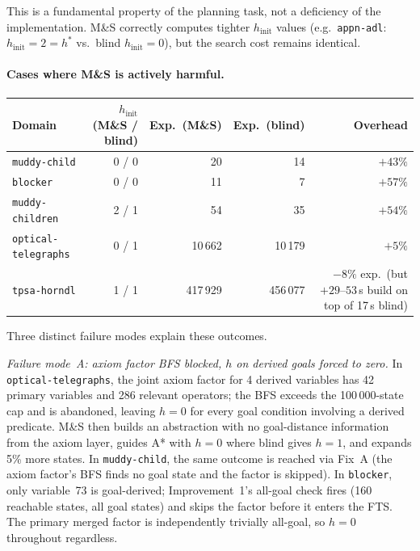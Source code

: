 \documentclass[11pt,a4paper]{article}
\begin{document}
This is a fundamental property of the planning task, not a deficiency of the
implementation.  M\&S correctly computes tighter $h_{\mathrm{init}}$ values
(e.g.\ \texttt{appn-adl}: $h_{\mathrm{init}} = 2 = h^*$ vs.\ blind
$h_{\mathrm{init}} = 0$), but the search cost remains identical.

\paragraph{Cases where M\&S is actively harmful.}

\begin{center}
\small
\begin{tabular}{lrrrr}
\toprule
\textbf{Domain} & $h_{\mathrm{init}}$ (M\&S / blind) & \textbf{Exp.\ (M\&S)}
  & \textbf{Exp.\ (blind)} & \textbf{Overhead} \\
\midrule
\texttt{muddy-child}       & 0 / 0 & 20      & 14      & $+43\%$ \\
\texttt{blocker}           & 0 / 0 & 11      & 7       & $+57\%$ \\
\texttt{muddy-children}    & 2 / 1 & 54      & 35      & $+54\%$ \\
\texttt{optical-telegraphs}& 0 / 1 & 10\,662 & 10\,179 & $+5\%$ \\
\texttt{tpsa-horndl}       & 1 / 1 & 417\,929 & 456\,077 & $-8\%$ exp.\
  (but $+29$--$53$\,s build on top of 17\,s blind) \\
\bottomrule
\end{tabular}
\end{center}

Three distinct failure modes explain these outcomes.

\emph{Failure mode~A: axiom factor BFS blocked, $h$ on derived goals forced to
zero.}  In \texttt{optical-telegraphs}, the joint axiom factor for 4 derived
variables has 42 primary variables and 286 relevant operators; the BFS exceeds
the 100\,000-state cap and is abandoned, leaving $h = 0$ for every goal
condition involving a derived predicate.  M\&S then builds an abstraction with
no goal-distance information from the axiom layer, guides A* with $h = 0$
where blind gives $h = 1$, and expands 5\% more states.
In \texttt{muddy-child}, the same outcome is reached via Fix~A (the axiom
factor's BFS finds no goal state and the factor is skipped).
In \texttt{blocker}, only variable~73 is goal-derived; Improvement~1's
all-goal check fires (160 reachable states, all goal states) and skips
the factor before it enters the FTS.  The primary merged factor is
independently trivially all-goal, so $h = 0$ throughout regardless.
\end{document}

